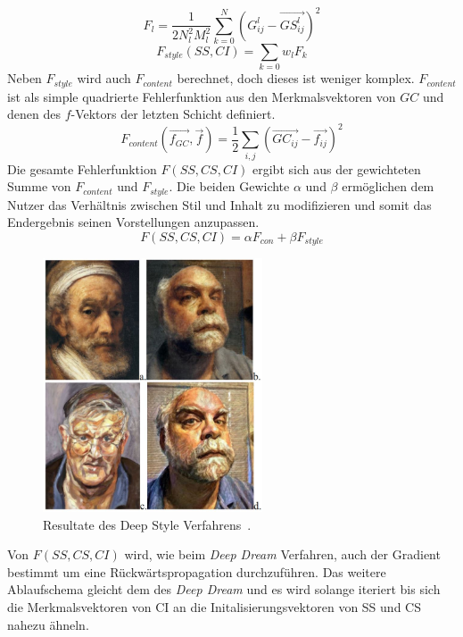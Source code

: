 \documentclass[times, 11pt,twocolumn]{article}
\begin{document}
\footnotesize
\begin{equation}
F_l= \frac{1}{2N_l^2M_l^2}\sum_{k=0}^N (G_{ij}^l- \vec{GS_{ij}^l})^2
\label{eq:DeepStyleCorrErr}
\end{equation}
\small
\footnotesize
\begin{equation}
F_{style}(SS,CI)= \sum_{k=0} w_l F_k
\label{eq:DeepStyleStyleErr}
\end{equation}
\small
Neben $F_{style}$ wird auch $F_{content}$ berechnet, doch dieses ist weniger komplex. $F_{content}$ ist als simple quadrierte Fehlerfunktion aus den Merkmalsvektoren von $GC$ und denen des $f$-Vektors der letzten Schicht definiert. 
\footnotesize
\begin{equation}
F_{content}(\vec{f_{GC}}, \vec{f})= \frac{1}{2}\sum_{i,j}(\vec{GC_{ij}}- \vec{f_{ij}})^2
\label{eq:DeepStyleContError}
\end{equation}
\small
Die gesamte Fehlerfunktion $F(SS,CS,CI)$ ergibt sich aus der gewichteten Summe von $F_{content}$ und $F_{style}$. Die beiden Gewichte $\alpha$ und $\beta$ ermöglichen dem Nutzer das Verhältnis zwischen Stil und Inhalt zu modifizieren und somit das Endergebnis seinen Vorstellungen anzupassen. 
\footnotesize
\begin{equation}
F (SS,CS,CI)= \alpha F_{con}+\beta F_{style}
\label{eq:DeepStyleErr}
\end{equation}
\small

\begin{figure}
	\flushleft
	\includegraphics[width=6.5cm]{Bilder/DeepStyleResults.JPG}
	\caption{Resultate des Deep Style Verfahrens~\cite{McCaigDG16}.}
	\label{fig:DeepStyleResults}
\end{figure}
Von $F(SS,CS,CI)$ wird, wie beim \textit{Deep Dream} Verfahren, auch der Gradient bestimmt um eine Rückwärtspropagation durchzuführen. Das weitere Ablaufschema gleicht dem des \textit{Deep Dream} und es wird solange iteriert bis sich die Merkmalsvektoren von CI an die Initalisierungsvektoren von SS und CS nahezu ähneln.
\end{document}
